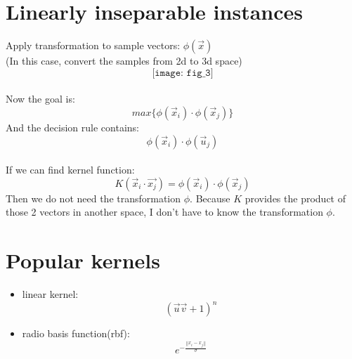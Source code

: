 \documentclass{article}
\begin{document}
\section{Linearly inseparable instances}
Apply transformation to sample vectors: $\phi(\vec{x})$
\\
(In this case, convert the samples from 2d to 3d space)
\\
\[
\texttt{[image: fig\_3]}
\]
\\
Now the goal is:
$$max\{\phi(\vec{x}_i)\cdot\phi(\vec{x}_j)\}$$
And the decision rule contains:
$$\phi(\vec{x}_i)\cdot\phi(\vec{u}_j)$$
\\
If we can find kernel function:
$$K(\vec{x}_i\cdot\vec{x_j})=\phi(\vec{x}_i)\cdot\phi(\vec{x}_j)$$
Then we do not need the transformation $\phi$. Because $K$ provides the product of those 2 vectors in another space, I don't have to know the transformation $\phi$.

\section{Popular kernels}
\begin{itemize}
    \item linear kernel:
        $$(\vec{u}\vec{v}+1)^n$$
    \item radio basis function(rbf):
        $$e^{-\frac{||x_i-x_j||}{\sigma}}$$
\end{itemize}
\end{document}
